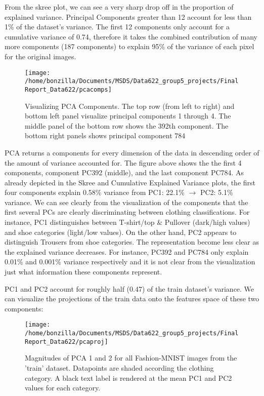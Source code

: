 \documentclass{article}
\begin{document}
From the skree plot, we can see a very sharp drop off in the proportion
of explained variance. Principal Components greater than 12 account for
less than 1\% of the dataset's variance. The first 12 components only
account for a cumulative variance of 0.74, therefore it takes the
combined contribution of many more components (187 components) to
explain 95\% of the variance of each pixel for the original images.

\begin{figure}

{\centering \texttt{[image: /home/bonzilla/Documents/MSDS/Data622\_group5\_projects/FinalReport\_Data622/pcacomps]} 

}

\caption{Visualizing PCA Components. The top row (from left to right) and bottom left panel visualize principal components 1 through 4. The middle panel of the bottom row shows the 392th component. The bottom right panels shows principal component 784}\label{fig:unnamed-chunk-4}
\end{figure}

PCA returns a components for every dimension of the data in descending
order of the amount of variance accounted for. The figure above shows
the the first 4 components, component PC392 (middle), and the last
component PC784. As already depicted in the Skree and Cumulative
Explained Variance plots, the first four components explain 0.58\%
variance from PC1: 22.1\% \(\rightarrow\) PC2: 5.1\% variance. We can
see clearly from the visualization of the components that the first
several PCs are clearly discriminating between clothing classifications.
For instance, PC1 distinguishes between T-shirt/top \& Pullover
(dark/high values) and shoe categories (light/low values). On the other
hand, PC2 appears to distinguish Trousers from shoe categories. The
representation become less clear as the explained variance decreases.
For instance, PC392 and PC784 only explain 0.01\% and 0.001\% variance
respectively and it is not clear from the visualization just what
information these components represent.

PC1 and PC2 account for roughly half (0.47) of the train dataset's
variance. We can visualize the projections of the train data onto the
features space of these two components:

\begin{figure}

{\centering \texttt{[image: /home/bonzilla/Documents/MSDS/Data622\_group5\_projects/FinalReport\_Data622/pcaproj]} 

}

\caption{Magnitudes of PCA 1 and 2 for all Fashion-MNIST images from the 'train' dataset. Datapoints are shaded according the clothing category. A black text label is rendered at the mean PC1 and PC2 values for each category.}\label{fig:unnamed-chunk-5}
\end{figure}
\end{document}
